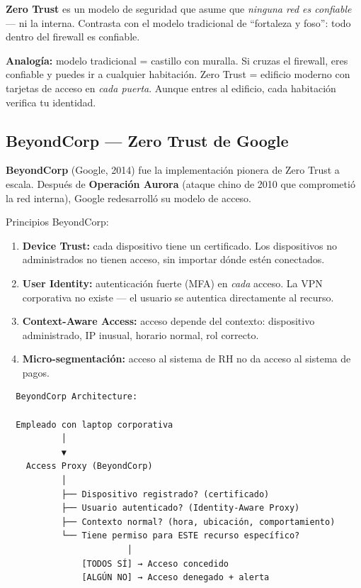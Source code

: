 \begin{concepto}
\textbf{Zero Trust} es un modelo de seguridad que asume que \textit{ninguna
red es confiable} --- ni la interna. Contrasta con el modelo tradicional
de ``fortaleza y foso'': todo dentro del firewall es confiable.

 \textbf{Analogía:} modelo tradicional = castillo con
muralla. Si cruzas el firewall, eres confiable y puedes ir a cualquier
habitación. Zero Trust = edificio moderno con tarjetas de acceso en
\textit{cada puerta}. Aunque entres al edificio, cada habitación verifica
tu identidad.
\end{concepto}

\subsection{BeyondCorp --- Zero Trust de Google}

\begin{concepto}
\textbf{BeyondCorp} (Google, 2014) fue la implementación pionera de Zero
Trust a escala. Después de \textbf{Operación Aurora} (ataque chino de 2010
que comprometió la red interna), Google redesarrolló su modelo de acceso.
\end{concepto}

Principios BeyondCorp:
\begin{enumerate}
    \item \textbf{Device Trust:} cada dispositivo tiene un certificado.
          Los dispositivos no administrados no tienen acceso, sin importar
          dónde estén conectados.
    \item \textbf{User Identity:} autenticación fuerte (MFA) en \textit{cada}
          acceso. La VPN corporativa no existe --- el usuario se autentica
          directamente al recurso.
    \item \textbf{Context-Aware Access:} acceso depende del contexto:
          dispositivo administrado, IP inusual, horario normal, rol correcto.
    \item \textbf{Micro-segmentación:} acceso al sistema de RH no da
          acceso al sistema de pagos.
\end{enumerate}

\begin{lstlisting}
  BeyondCorp Architecture:

  Empleado con laptop corporativa
           │
           ▼
    Access Proxy (BeyondCorp)
           │
           ├── Dispositivo registrado? (certificado)
           ├── Usuario autenticado? (Identity-Aware Proxy)
           ├── Contexto normal? (hora, ubicación, comportamiento)
           └── Tiene permiso para ESTE recurso específico?
                        │
               [TODOS SÍ] → Acceso concedido
               [ALGÚN NO] → Acceso denegado + alerta
\end{lstlisting}

